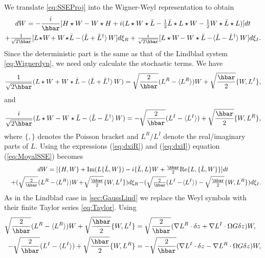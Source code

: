 \documentclass[12pt]{iopart} %
\begin{document}
We translate \cref{eq:SSEProj} into the Wigner-Weyl representation to obtain
\begin{multline} \label{eq:MoyalSSE}
	dW=-\frac{i}{\hbar}[H \star W-W\star H+ i ( L\star W \star \bar{L}-\tfrac{1}{2}\bar{L}\star L\star W -\tfrac12W \star \bar{L}\star L ) ]dt \\
		+ \tfrac{1}{\sqrt{2\hbar}}[L\!\star\! W\!+W\!\star\! \bar{L}-\!\braket{\hat{L}+\hat{L}^{\dagger}}W]d\xi_R+\tfrac{ i}{\sqrt{2\hbar}}[L \star W\!-W \star\bar{L}-\!\braket{\hat{L}-\hat{L}^{\dagger}}W]d\xi_I. 
\end{multline}
Since the deterministic part is the same as that of the Lindblad system \cref{eq:Wignerdyn}, we need only calculate the stochastic terms. We have
\begin{equation} \label{eq:dxiR}
	 \frac{1}{\sqrt{2\hbar }}(L\star W+ W\star \bar{L}-\braket{\hat{L}+\hat{L}^{\dagger}}W)= \sqrt{\frac{2}{\hbar}}(L^{R}-\braket{L^R}) W+\sqrt{\frac{\hbar}{2}}\{W,L^I\},
\end{equation}
and
\begin{equation} \label{eq:dxiI}
	\frac{i}{\sqrt{2\hbar }}(L\star W-W\star\bar{L} -\braket{\hat{L}-\hat{L}^{\dagger}}W)=-\sqrt{\frac{2}{ \hbar}}(L^{I}-\braket{L^{I}})+\sqrt{\frac{\hbar}{2}}\{W,L^R\},
\end{equation}
where $\{,\}$ denotes the Poisson bracket and $L^R/L^I$ denote the real/imaginary parts of $L$. 
Using the expressions (\ref{eq:dxiR}) and (\ref{eq:dxiI}) equation (\ref{eq:MoyalSSE}) becomes 
\begin{multline}
		 dW = [ \{H,W\}  + \text{Im}(L\{\bar{L},W\}) -i  \{\bar{L},L \}W+\tfrac{\hbar}{2} \text{Re}\{L,\{\bar{L},W\}\} ]dt \\
		 \quad+( \sqrt{\tfrac{2}{\hbar}}(L^{R}-\!\braket{L^R}) W\!+\!\sqrt{\tfrac{\hbar}{2}}\{W,L^I \} )d\xi_R\! -\!(\sqrt{\tfrac{2}{ \hbar}}(L^{I}-\!\braket{L^{I}})-\sqrt{\tfrac{\hbar}{2}}\{W,L^R\})d\xi_I.
\end{multline}
As in the Lindblad case in \cref{sec:GaussLind} we replace the Weyl symbols with their finite Taylor series \cref{eq:Taylor}. 
Using
\begin{align}
	\begin{split}
	\sqrt{\frac{2}{\hbar}}(L^{R}-\braket{L^R}) W+\sqrt{\frac{\hbar}{2}}\{W,L^I \}&= \sqrt{\frac{2}{ \hbar}}(\nabla L^R\cdot \delta z+ \nabla L^I \cdot \Omega G \delta z)W,  \\
	 -\sqrt{\frac{2}{ \hbar}}(L^{I}-\braket{L^{I}})+\sqrt{\frac{\hbar}{2}}\{W,L^R\}&= -\sqrt{\frac{2}{ \hbar}}(\nabla L^I\cdot \delta z- \nabla L^R \cdot \Omega G \delta z)W,
	 \end{split}
\end{align}
\end{document}
